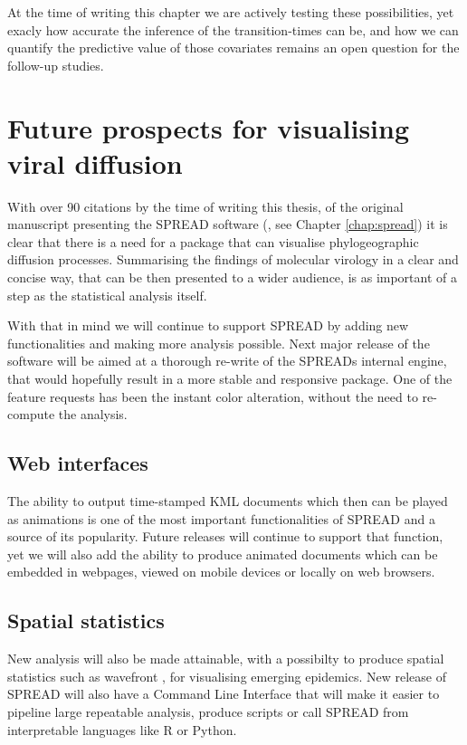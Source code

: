 At the time of writing this chapter we are actively testing these possibilities, yet exacly how accurate the inference of the transition-times can be, and how we can quantify the predictive value of those covariates remains an open question for the follow-up studies.

\section{Future prospects for visualising viral diffusion}

With over 90 citations by the time of writing this thesis, of the original manuscript presenting the SPREAD software (\citet{Bielejec2011}, see Chapter \ref{chap:spread}) it is clear that there is a need for a package that can visualise phylogeographic diffusion processes.
Summarising the findings of molecular virology in a clear and concise way, that can be then presented to a wider audience, is as important of a step as the statistical analysis itself.

With that in mind we will continue to support SPREAD by adding new functionalities and making more analysis possible.
Next major release of the software will be aimed at a thorough re-write of the SPREADs internal engine, that would hopefully result in a more stable and responsive package.
One of the feature requests has been the instant color alteration, without the need to re-compute the analysis.

\subsection{Web interfaces}

The ability to output time-stamped KML documents which then can be played as animations is one of the most important functionalities of SPREAD and a source of its popularity.
Future releases will continue to support that function, yet we will also add the ability to produce animated documents which can be embedded in webpages, viewed on mobile devices or locally on web browsers.

\subsection{Spatial statistics}

New analysis will also be made attainable, with a possibilty to produce spatial statistics such as wavefront \citep{Pybus2012}, for visualising emerging epidemics.
New release of SPREAD will also have a Command Line Interface that will make it easier to pipeline large repeatable analysis, produce scripts or call SPREAD from interpretable languages like R \citep{RCran} or Python.



